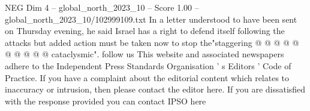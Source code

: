 \begin{textsample}{NEG Dim 4 – global\_north\_2023\_10 – Score 1.00 – global\_north\_2023\_10/102999109.txt}
In a letter understood to have been sent on Thursday evening, he said Israel has a right to defend itself following the attacks but added action must be taken now to stop the"staggering @ @ @ @ @ @ @ @ @ @ cataclysmic". follow us This website and associated newspapers adhere to the Independent Press Standards Organisation ' s Editors ' Code of Practice.
If you have a complaint about the editorial content which relates to inaccuracy or intrusion, then please contact the editor here.
If you are dissatisfied with the response provided you can contact IPSO here

\end{textsample}
